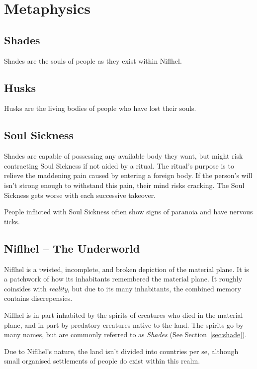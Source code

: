 \section{Metaphysics}
\subsection{Shades}
Shades are the souls of people as they exist within Niflhel.
\subsection{Husks}
Husks are the living bodies of people who have lost their souls.
\subsection{Soul Sickness}
Shades are capable of possessing any available body they want, but might risk contracting Soul Sickness if not aided by a ritual.
The ritual's purpose is to relieve the maddening pain caused by entering a foreign body.
If the person's will isn't strong enough to withstand this pain, their mind risks cracking.
The Soul Sickness gets worse with each successive takeover.

People inflicted with Soul Sickness often show signs of paranoia and have nervous ticks.
\subsection{Niflhel -- The Underworld}
Niflhel is a twisted, incomplete, and broken depiction of the material plane.
It is a patchwork of how its inhabitants remembered the material plane.
It roughly coinsides with \textit{reality}, but due to its many inhabitants, the combined memory contains discrepensies.

Niflhel is in part inhabited by the spirits of creatures who died in the material plane, and in part by predatory creatures native to the land.
The spirits go by many names, but are commonly referred to as \textit{Shades} (See Section~\ref{sec:shade}).

Due to Niflhel's nature, the land isn't divided into countries per se, although small organised settlements of people do exist within this realm.